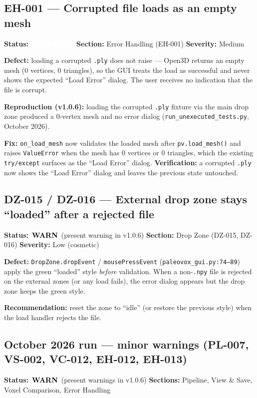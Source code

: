 \documentclass[12pt,a4paper]{article}
\newcommand{\statuswarn}{\colorbox{statusyellow}{\textcolor{black}{\textbf{\,WARN\,}}}}
\newcommand{\statusresolved}{\colorbox{statusorange}{\textcolor{white}{\textbf{\,RESOLVED\,}}}}
\begin{document}
\subsection{EH-001 --- Corrupted file loads as an empty mesh}
\textbf{Status:} \statusresolved \quad \textbf{Section:}
Error Handling (EH-001) \quad \textbf{Severity:} Medium

\textbf{Defect:} loading a corrupted \texttt{.ply} does not raise --- Open3D
returns an empty mesh (0 vertices, 0 triangles), so the GUI treats the load as
successful and never shows the expected ``Load Error'' dialog. The user
receives no indication that the file is corrupt.

\textbf{Reproduction (v1.0.6):} loading the corrupted \texttt{.ply} fixture via
the main drop zone produced a 0-vertex mesh and no error dialog
(\texttt{run\_unexecuted\_tests.py}, October 2026).

\textbf{Fix:} \texttt{on\_load\_mesh} now validates the loaded mesh after
\texttt{pv.load\_mesh()} and raises \texttt{ValueError} when the mesh has 0
vertices or 0 triangles, which the existing \texttt{try/except} surfaces as the
``Load Error'' dialog. \textbf{Verification:} a corrupted \texttt{.ply} now
shows the ``Load Error'' dialog and leaves the previous state untouched.

\subsection{DZ-015 / DZ-016 --- External drop zone stays ``loaded'' after a rejected file}
\textbf{Status:} \statuswarn{} (present warning in v1.0.6) \quad \textbf{Section:}
Drop Zone (DZ-015, DZ-016) \quad \textbf{Severity:} Low (cosmetic)

\textbf{Defect:} \texttt{DropZone.dropEvent} / \texttt{mousePressEvent}
(\texttt{paleovox\_gui.py:74--89}) apply the green ``loaded'' style \emph{before}
validation. When a non-\texttt{.npy} file is rejected on the external zones (or
any load fails), the error dialog appears but the drop zone keeps the green
style.

\textbf{Recommendation:} reset the zone to ``idle'' (or restore the previous
style) when the load handler rejects the file.

\subsection{October 2026 run --- minor warnings (PL-007, VS-002, VC-012, EH-012, EH-013)}
\textbf{Status:} \statuswarn{} (present warnings in v1.0.6) \quad
\textbf{Sections:} Pipeline, View \& Save, Voxel Comparison, Error Handling
\end{document}
